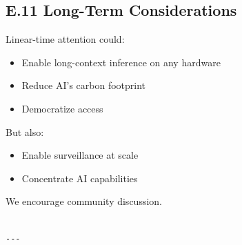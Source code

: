 \subsection{E.11 Long-Term Considerations}

Linear-time attention could:

\begin{itemize}
\item Enable long-context inference on any hardware
\item Reduce AI's carbon footprint
\item Democratize access

\end{itemize}
But also:

\begin{itemize}
\item Enable surveillance at scale
\item Concentrate AI capabilities

\end{itemize}
We encourage community discussion.
\begin{lstlisting}

---
\end{lstlisting}